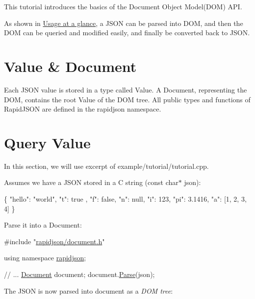 This tutorial introduces the basics of the Document Object Model(\+D\+O\+M) A\+PI.

As shown in \hyperlink{index}{Usage at a glance}, a J\+S\+ON can be parsed into D\+OM, and then the D\+OM can be queried and modified easily, and finally be converted back to J\+S\+ON.\hypertarget{md_Commun_Externe_RapidJSON_doc_tutorial.zh-cn_ValueDocument}{}\section{Value \& Document}\label{md_Commun_Externe_RapidJSON_doc_tutorial.zh-cn_ValueDocument}
Each J\+S\+ON value is stored in a type called {\ttfamily Value}. A {\ttfamily Document}, representing the D\+OM, contains the root {\ttfamily Value} of the D\+OM tree. All public types and functions of Rapid\+J\+S\+ON are defined in the {\ttfamily rapidjson} namespace.\hypertarget{md_Commun_Externe_RapidJSON_doc_tutorial.zh-cn_QueryValue}{}\section{Query Value}\label{md_Commun_Externe_RapidJSON_doc_tutorial.zh-cn_QueryValue}
In this section, we will use excerpt of {\ttfamily example/tutorial/tutorial.\+cpp}.

Assumes we have a J\+S\+ON stored in a C string ({\ttfamily const char$\ast$ json})\+: 
\begin{DoxyCode}
\{
    \textcolor{stringliteral}{"hello"}: \textcolor{stringliteral}{"world"},
    \textcolor{stringliteral}{"t"}: true ,
    \textcolor{stringliteral}{"f"}: \textcolor{keyword}{false},
    \textcolor{stringliteral}{"n"}: null,
    \textcolor{stringliteral}{"i"}: 123,
    \textcolor{stringliteral}{"pi"}: 3.1416,
    \textcolor{stringliteral}{"a"}: [1, 2, 3, 4]
\}
\end{DoxyCode}


Parse it into a {\ttfamily Document}\+: 
\begin{DoxyCode}
\textcolor{preprocessor}{#include "\hyperlink{document_8h}{rapidjson/document.h}"}

\textcolor{keyword}{using namespace }\hyperlink{namespacerapidjson}{rapidjson};

\textcolor{comment}{// ...}
\hyperlink{class_generic_document}{Document} document;
document.\hyperlink{class_generic_document_aebd4e7fddd80c1e1174837aee6d2159b}{Parse}(json);
\end{DoxyCode}


The J\+S\+ON is now parsed into {\ttfamily document} as a {\itshape D\+OM tree}\+:



